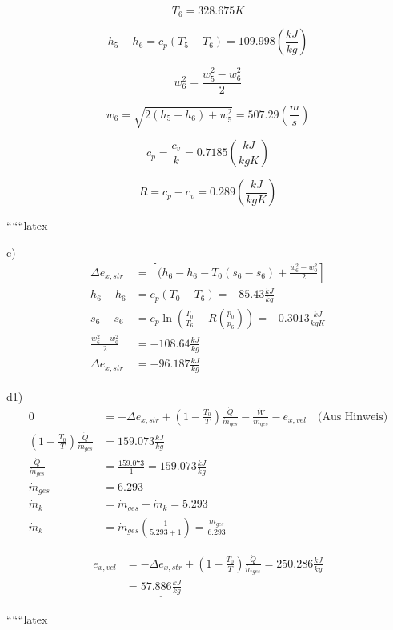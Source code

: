 \[
T_6 = 328.675 K
\]

\[
h_5 - h_6 = c_p (T_5 - T_6) = 109.998 \left( \frac{kJ}{kg} \right)
\]

\[
w_6^2 = \frac{w_5^2 - w_6^2}{2}
\]

\[
w_6 = \sqrt{2(h_5 - h_6) + w_5^2} = 507.29 \left( \frac{m}{s} \right)
\]

\[
c_p = \frac{c_v}{k} = 0.7185 \left( \frac{kJ}{kg K} \right)
\]

\[
R = c_p - c_v = 0.289 \left( \frac{kJ}{kg K} \right)
\]

``````latex


c) 
\begin{align*}
\Delta e_{x,str} &= \left[ (h_6 - h_6 - T_0 (s_6 - s_6) + \frac{w_6^2 - w_0^2}{2} \right] \\
h_6 - h_6 &= c_p (T_0 - T_6) = -85.43 \frac{kJ}{kg} \\
s_6 - s_6 &= c_p \ln \left( \frac{T_0}{T_6} - R \left( \frac{p_0}{p_6} \right) \right) = -0.3013 \frac{kJ}{kgK} \\
\frac{w_6^2 - w_0^2}{2} &= -108.64 \frac{kJ}{kg} \\
\Delta e_{x,str} &= \underline{-96.187 \frac{kJ}{kg}}
\end{align*}

d1)
\begin{align*}
0 &= -\Delta e_{x,str} + \left( 1 - \frac{T_0}{T} \right) \frac{\dot{Q}}{\dot{m}_{ges}} - \frac{\dot{W}}{\dot{m}_{ges}} - e_{x,vel} \quad \text{(Aus Hinweis)} \\
\left( 1 - \frac{T_0}{T} \right) \frac{\dot{Q}}{\dot{m}_{ges}} &= 159.073 \frac{kJ}{kg} \\
\frac{\dot{Q}}{\dot{m}_{ges}} &= \frac{159.073}{1} = 159.073 \frac{kJ}{kg} \\
\dot{m}_{ges} &= 6.293 \\
\dot{m}_k &= \dot{m}_{ges} - \dot{m}_k = 5.293 \\
\dot{m}_k &= \dot{m}_{ges} \left( \frac{1}{5.293 + 1} \right) = \frac{\dot{m}_{ges}}{6.293}
\end{align*}

\begin{align*}
e_{x,vel} &= -\Delta e_{x,str} + \left( 1 - \frac{T_0}{T} \right) \frac{\dot{Q}}{\dot{m}_{ges}} = 250.286 \frac{kJ}{kg} \\
&= \underline{57.886 \frac{kJ}{kg}}
\end{align*}

``````latex


